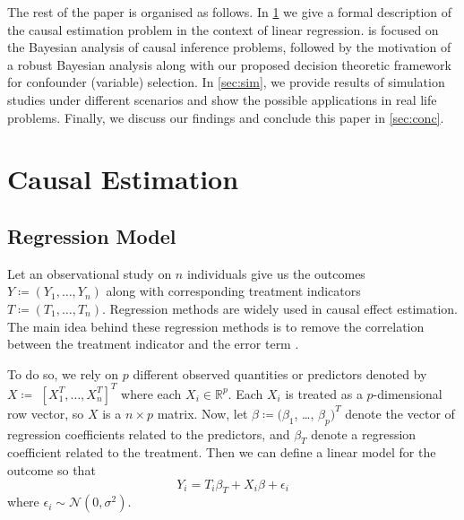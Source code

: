 \documentclass[preprint,12pt]{elsarticle}
\begin{document}
The rest of the paper is organised as follows. In \cref{sec:causal}
we give a formal description of the causal estimation problem in the
context of linear regression.  is focused on the
Bayesian analysis of causal inference problems, followed by the
motivation of a robust Bayesian analysis along with our proposed decision 
theoretic framework for confounder (variable) selection. In \cref{sec:sim}, 
we provide results of simulation studies under different scenarios 
and show the possible applications in real life problems. Finally, 
we discuss our findings and conclude this paper in \cref{sec:conc}.

\section{Causal Estimation}\label{sec:causal}

\subsection{Regression Model}

Let an observational study on $n$ individuals give us
the outcomes $Y\coloneqq(Y_1, \dots, Y_n)$ along with 
corresponding treatment indicators $T\coloneqq(T_1, \dots, T_n)$.
Regression methods are widely used in causal effect estimation. The
main idea behind these regression methods is to remove the
correlation between the treatment indicator and the error term
\citep{winship99,HECKMAN1985}.




To do so, we rely on $p$ different observed quantities
or predictors denoted by $X\coloneqq$ $[X_1^T, \dots, X_n^T]^T$
where each $X_i\in\mathbb{R}^p$.
Each $X_i$ is treated as a $p$-dimensional row vector,
so $X$ is a $n\times p$ matrix.
Now, let
$\beta \coloneqq (\beta_1$, \dots, $\beta_p)^T$ denote the vector of regression
coefficients
related to the predictors, and $\beta_T$ denote a regression coefficient related to the treatment.
Then we can define a linear model for the outcome
so that
\begin{equation}
	Y_i =  T_i \beta_{T} + X_i\beta + \epsilon_i
\end{equation}
where $\epsilon_i\sim \mathcal{N}(0, \sigma^2)$.
\end{document}
